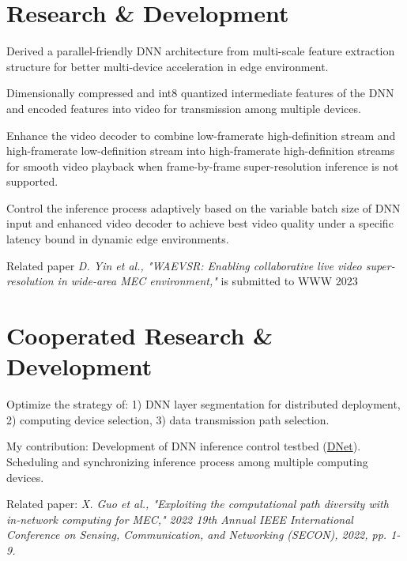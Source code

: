 \documentclass[]{deedy-resume-openfont}
\begin{document}
\begin{minipage}[t]{0.76\textwidth} 


\section{Research \& Development}
\vspace{\topsep}
\begin{tightemize}
    \item Derived a parallel-friendly DNN architecture from multi-scale feature extraction structure for better multi-device acceleration in edge environment. %
    \item Dimensionally compressed and int8 quantized intermediate features of the DNN and encoded features into video for transmission among multiple devices. %
    \item Enhance the video decoder to combine low-framerate high-definition stream and high-framerate low-definition stream into high-framerate high-definition streams for smooth video playback when frame-by-frame super-resolution inference is not supported. %
    \item Control the inference process adaptively based on the variable batch size of DNN input and enhanced video decoder to achieve best video quality under a specific latency bound in dynamic edge environments.
    \item Related paper \textit{D. Yin et al., "WAEVSR: Enabling collaborative live video super-resolution in wide-area MEC environment,"} is submitted to WWW 2023
\end{tightemize}
\sectionsep


\section{Cooperated Research \& Development}
\begin{tightemize}
    \item Optimize the strategy of: 1) DNN layer segmentation for distributed deployment, 2) computing device selection, 3) data transmission path selection.
    \item My contribution: Development of DNN inference control testbed (\href{https://github.com/yindaheng98/DNet}{DNet}). Scheduling and synchronizing inference process among multiple computing devices.
    \item Related paper: \textit{X. Guo et al., "Exploiting the computational path diversity with in-network computing for MEC," 2022 19th Annual IEEE International Conference on Sensing, Communication, and Networking (SECON), 2022, pp. 1-9.}
\end{tightemize}
\sectionsep


\end{minipage}
\end{document}
